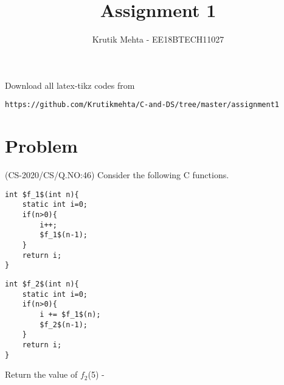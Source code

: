\documentclass[journal,12pt,twocolumn]{IEEEtran}
\begin{document}
     \def\rightbox#1{\makebox[0in][r]{#1}}
     \def\centbox#1{\makebox[0in]{#1}}
     \def\topbox#1{\raisebox{-\baselineskip}[0in][0in]{#1}}
     \def\midbox#1{\raisebox{-0.5\baselineskip}[0in][0in]{#1}}
\vspace{3cm}
\title{Assignment 1}
\author{Krutik Mehta - EE18BTECH11027}
\maketitle
\newpage
\bigskip
\renewcommand{\thefigure}{\theenumi}
\renewcommand{\thetable}{\theenumi}
Download all latex-tikz codes from 
%
\begin{lstlisting}
https://github.com/Krutikmehta/C-and-DS/tree/master/assignment1
\end{lstlisting}
\section{Problem}
(CS-2020/CS/Q.NO:46) Consider the following C functions.
\begin{lstlisting}[mathescape=true]
int $f_1$(int n){
    static int i=0;
    if(n>0){
        i++;
        $f_1$(n-1);
    }
    return i;
}
\end{lstlisting}

\begin{lstlisting}[mathescape=true]
int $f_2$(int n){
    static int i=0;
    if(n>0){
        i += $f_1$(n);
        $f_2$(n-1);
    }
    return i;
}
\end{lstlisting}

Return the value of $f_2$(5) - 
\end{document}
